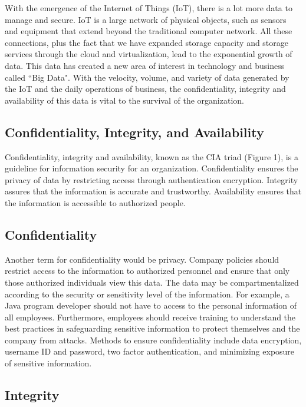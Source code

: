 \documentclass{article}
\begin{document}
With the emergence of the Internet of Things (IoT), there is a lot more data to manage and secure. IoT is a large network of physical objects, such as sensors and equipment that extend beyond the traditional computer network. All these connections, plus the fact that we have expanded storage capacity and storage services through the cloud and virtualization, lead to the exponential growth of data. This data has created a new area of interest in technology and business called “Big Data". With the velocity, volume, and variety of data generated by the IoT and the daily operations of business, the confidentiality, integrity and availability of this data is vital to the survival of the organization.

\subsection{Confidentiality, Integrity, and Availability}


Confidentiality, integrity and availability, known as the CIA triad (Figure 1), is a guideline for information security for an organization. Confidentiality ensures the privacy of data by restricting access through authentication encryption. Integrity assures that the information is accurate and trustworthy. Availability ensures that the information is accessible to authorized people.
\subsection*{Confidentiality}


Another term for confidentiality would be privacy. Company policies should restrict access to the information to authorized personnel and ensure that only those authorized individuals view this data. The data may be compartmentalized according to the security or sensitivity level of the information. For example, a Java program developer should not have to access to the personal information of all employees. Furthermore, employees should receive training to understand the best practices in safeguarding sensitive information to protect themselves and the company from attacks. Methods to ensure confidentiality include data encryption, username ID and password, two factor authentication, and minimizing exposure of sensitive information.

\subsection*{Integrity}
\end{document}
